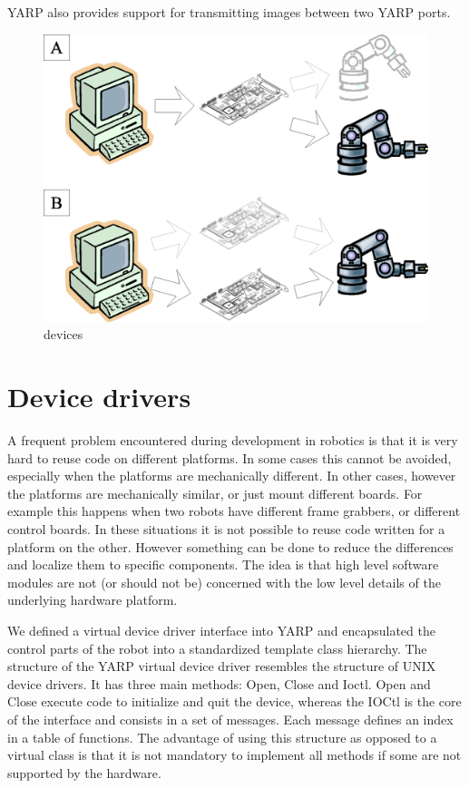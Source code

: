 YARP also provides support for transmitting images between two YARP
ports.


\begin{figure}[t]
\centerline{\includegraphics[width=\columnwidth]{fig-devices}}
\caption{
devices
}
\end{figure}

\section{Device drivers}

A frequent problem encountered during development in robotics is that
it is very hard to reuse code on different platforms. In some cases
this cannot be avoided, especially when the platforms are mechanically
different. In other cases, however the platforms are mechanically
similar, or just mount different boards. For example this happens when
two robots have different frame grabbers, or different control
boards. In these situations it is not possible to reuse code written
for a platform on the other. However something can be done to reduce
the differences and localize them to specific components. The idea is
that high level software modules are not (or should not be) concerned
with the low level details of the underlying hardware platform.

We defined a virtual device driver interface into YARP and
encapsulated the control parts of the robot into a standardized
template class hierarchy. The structure of the YARP virtual device
driver resembles the structure of UNIX device drivers. It has three
main methods: Open, Close and Ioctl. Open and Close execute code to
initialize and quit the device, whereas the IOCtl is the core of the
interface and consists in a set of messages. Each message defines an
index in a table of functions. The advantage of using this structure
as opposed to a virtual class is that it is not mandatory to implement
all methods if some are not supported by the hardware.

